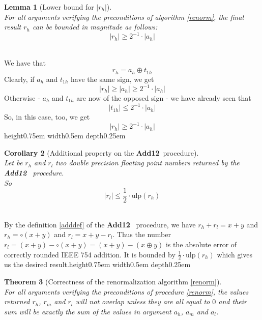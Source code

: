 \documentclass[a4paper,10pt,twoside]{article}
\newtheorem{theorem}{Theorem}[section]
\newtheorem{lemma}[theorem]{Lemma}
\newtheorem{corollary}[theorem]{Corollary}
\newenvironment{proof}[1][Proof]{\begin{trivlist}
\item[\hskip \labelsep {\bfseries #1}]}{\end{trivlist}}
\newcommand{\qed}{\nobreak \ifvmode \relax \else \ifdim \lastskip<1.5em \hskip-\lastskip
\hskip1.5em plus0em minus0.5em \fi \nobreak \vrule height0.75em width0.5em depth0.25em\fi}
\newcommand{\hi}{\ensuremath{\mathit{h}}}
\newcommand{\mi}{\ensuremath{\mathit{m}}}
\newcommand{\lo}{\ensuremath{\mathit{l}}}
\newcommand{\Add}{{\bf Add12}}
\newcommand{\mUlp}{\ensuremath{\mathrm{ulp}}}
\begin{document}
\begin{lemma}[Lower bound for $\left \vert r_\hi \right \vert$] \label{minor}~\\
For all arguments verifying the preconditions of algorithm \ref{renorm},
the final result
$r_\hi$
can be bounded in magnitude as follows:
$$\left \vert r_\hi \right \vert \geq 2^{-1} \cdot \left \vert a_\hi \right \vert$$
\end{lemma}
\begin{proof} ~\\
We have that
$$r_\hi = a_\hi \oplus t_{1\hi}$$
Clearly, if $a_\hi$ and $t_{1\hi}$ have the same sign, we get
$$\left \vert r_\hi \right \vert \geq \left \vert a_\hi \right \vert \geq 2^{-1} \cdot \left \vert a_\hi \right \vert$$
Otherwise - $a_\hi$ and $t_{1\hi}$ are now of the opposed sign - we have
already seen that
$$\left \vert t_{1\hi} \right \vert \leq 2^{-1} \cdot \left \vert a_\hi \right \vert$$
So, in this case, too, we get
$$\left \vert r_\hi \right \vert \geq 2^{-1} \cdot \left \vert a_\hi \right \vert$$ \qed
\end{proof}
\begin{corollary}[Additional property on the \Add~procedure] \label{addsupp} ~\\
Let be $r_\hi$ and $r_\lo$ two double precision floating point numbers returned
by the \Add~ procedure. \\
So
$$\left \vert r_\lo \right \vert \leq \frac{1}{2} \cdot \mUlp\left( r_\hi \right)$$
\end{corollary}
\begin{proof} ~\\
By the definition \ref{adddef} of the \Add~ procedure, we have
$r_\hi + r_\lo = x + y$ and $r_\hi = \circ \left( x + y \right)$ and $r_\lo = x+y -r_\lo$.
Thus the number $r_\lo = \left( x + y \right) - \circ \left( x + y \right) =
\left( x + y \right) - \left( x \oplus y \right)$ is the absolute error of correctly
rounded IEEE 754 addition. It is bounded by $\frac{1}{2} \cdot \mUlp\left( r_\hi \right)$ which
gives us the desired result.\qed
\end{proof}
\begin{theorem}[Correctness of the renormalization algorithm \ref{renorm}] ~\\
For all arguments verifying the preconditions of procedure \ref{renorm},
the values returned
$r_\hi$, $r_\mi$ and $r_\lo$ will not overlap
unless they are all equal to $0$ and their sum will be exactly the sum of the
values in argument $a_\hi$, $a_\mi$ and $a_\lo$.
\end{theorem}
\end{document}
